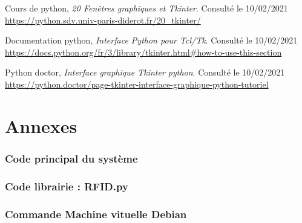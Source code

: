 \documentclass[a4paper]{report}
\begin{document}
\begin{thebibliography}{9}
        \bibitem{}\label{bib:multicore_pico}
            Cours de python,
            \emph{20 Fenêtres graphiques et Tkinter}. \newline
            Consulté le 10/02/2021\\
            \url{https://python.sdv.univ-paris-diderot.fr/20_tkinter/}

        \bibitem{}\label{bib:multicore_pico}
            Documentation python,
            \emph{Interface Python pour Tcl/Tk}. \newline
            Consulté le 10/02/2021 \\
            \url{https://docs.python.org/fr/3/library/tkinter.html#how-to-use-this-section}

        \bibitem{}\label{bib:multicore_pico}
            Python doctor,
            \emph{Interface graphique Tkinter python}. \newline
            Consulté le 10/02/2021 \\
            \url{https://python.doctor/page-tkinter-interface-graphique-python-tutoriel}
    \end{thebibliography}

    \appendix{}
    
    \part{Annexes}
    
        \section{Code principal du système}
        \section{Code librairie : RFID.py}
        
        \section{Commande Machine vituelle Debian} \label{sec:cde machine virtuelle}
\end{document}
